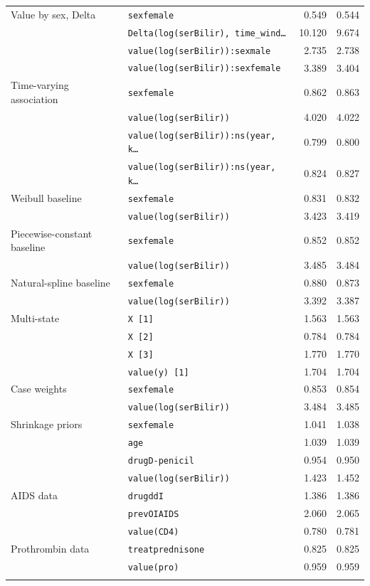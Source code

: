 \begin{longtable}{llrr}
\addlinespace
Value by sex, Delta & \texttt{sexfemale} & 0.549 & 0.544 \\
 & \texttt{Delta(log(serBilir), time\_wind\ldots} & 10.120 & 9.674 \\
 & \texttt{value(log(serBilir)):sexmale} & 2.735 & 2.738 \\
 & \texttt{value(log(serBilir)):sexfemale} & 3.389 & 3.404 \\
\addlinespace
Time-varying association & \texttt{sexfemale} & 0.862 & 0.863 \\
 & \texttt{value(log(serBilir))} & 4.020 & 4.022 \\
 & \texttt{value(log(serBilir)):ns(year, k\ldots} & 0.799 & 0.800 \\
 & \texttt{value(log(serBilir)):ns(year, k\ldots} & 0.824 & 0.827 \\
\addlinespace
Weibull baseline & \texttt{sexfemale} & 0.831 & 0.832 \\
 & \texttt{value(log(serBilir))} & 3.423 & 3.419 \\
\addlinespace
Piecewise-constant baseline & \texttt{sexfemale} & 0.852 & 0.852 \\
 & \texttt{value(log(serBilir))} & 3.485 & 3.484 \\
\addlinespace
Natural-spline baseline & \texttt{sexfemale} & 0.880 & 0.873 \\
 & \texttt{value(log(serBilir))} & 3.392 & 3.387 \\
\addlinespace
Multi-state & \texttt{X [1]} & 1.563 & 1.563 \\
 & \texttt{X [2]} & 0.784 & 0.784 \\
 & \texttt{X [3]} & 1.770 & 1.770 \\
 & \texttt{value(y) [1]} & 1.704 & 1.704 \\
\addlinespace
Case weights & \texttt{sexfemale} & 0.853 & 0.854 \\
 & \texttt{value(log(serBilir))} & 3.484 & 3.485 \\
\addlinespace
Shrinkage priors & \texttt{sexfemale} & 1.041 & 1.038 \\
 & \texttt{age} & 1.039 & 1.039 \\
 & \texttt{drugD-penicil} & 0.954 & 0.950 \\
 & \texttt{value(log(serBilir))} & 1.423 & 1.452 \\
\addlinespace
AIDS data & \texttt{drugddI} & 1.386 & 1.386 \\
 & \texttt{prevOIAIDS} & 2.060 & 2.065 \\
 & \texttt{value(CD4)} & 0.780 & 0.781 \\
\addlinespace
Prothrombin data & \texttt{treatprednisone} & 0.825 & 0.825 \\
 & \texttt{value(pro)} & 0.959 & 0.959 \\
\addlinespace
\end{longtable}
\endgroup
